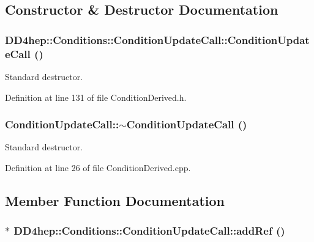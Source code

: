 \subsection{Constructor \& Destructor Documentation}
\hypertarget{class_d_d4hep_1_1_conditions_1_1_condition_update_call_a23a8cb42aaec80443044176c061f5281}{
\subsubsection[{ConditionUpdateCall}]{\setlength{\rightskip}{0pt plus 5cm}DD4hep::Conditions::ConditionUpdateCall::ConditionUpdateCall ()}}
\label{class_d_d4hep_1_1_conditions_1_1_condition_update_call_a23a8cb42aaec80443044176c061f5281}


Standard destructor. 

Definition at line 131 of file ConditionDerived.h.\hypertarget{class_d_d4hep_1_1_conditions_1_1_condition_update_call_a1dd8b3414b91f74877af4325c0a0e3c4}{
\subsubsection[{$\sim$ConditionUpdateCall}]{\setlength{\rightskip}{0pt plus 5cm}ConditionUpdateCall::$\sim$ConditionUpdateCall ()}}
\label{class_d_d4hep_1_1_conditions_1_1_condition_update_call_a1dd8b3414b91f74877af4325c0a0e3c4}


Standard destructor. 

Definition at line 26 of file ConditionDerived.cpp.

\subsection{Member Function Documentation}
\hypertarget{class_d_d4hep_1_1_conditions_1_1_condition_update_call_a6cba5a3773d6291e478b575d1083910f}{
\subsubsection[{addRef}]{$\ast$ DD4hep::Conditions::ConditionUpdateCall::addRef ()}}
\label{class_d_d4hep_1_1_conditions_1_1_condition_update_call_a6cba5a3773d6291e478b575d1083910f}


